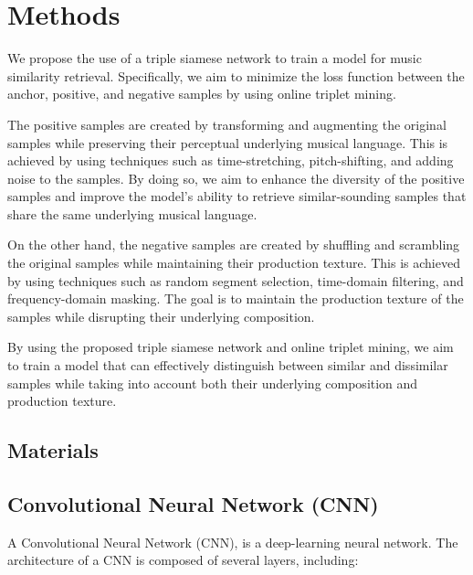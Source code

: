 \chapter{Methods}

We propose the use of a triple siamese network to train a model for music similarity retrieval. Specifically, we aim to minimize the loss function between the anchor, positive, and negative samples by using online triplet mining.

The positive samples are created by transforming and augmenting the original samples while preserving their perceptual underlying musical language. This is achieved by using techniques such as time-stretching, pitch-shifting, and adding noise to the samples. By doing so, we aim to enhance the diversity of the positive samples and improve the model's ability to retrieve similar-sounding samples that share the same underlying musical language.

On the other hand, the negative samples are created by shuffling and scrambling the original samples while maintaining their production texture. This is achieved by using techniques such as random segment selection, time-domain filtering, and frequency-domain masking. The goal is to maintain the production texture of the samples while disrupting their underlying composition.

By using the proposed triple siamese network and online triplet mining, we aim to train a model that can effectively distinguish between similar and dissimilar samples while taking into account both their underlying composition and production texture.

\section{Materials}

\section{Convolutional Neural Network (CNN)}

A Convolutional Neural Network (CNN), is a deep-learning neural network. The architecture of a CNN is composed of several layers, including:


